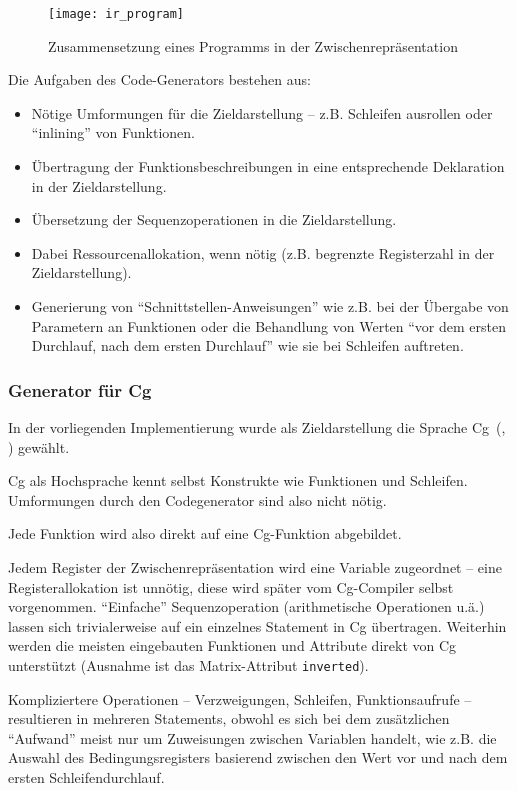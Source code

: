 \documentclass[twoside,a4paper,fleqn,12pt]{article}
\begin{document}
\begin{figure}[h]
   \centering
  \texttt{[image: ir\_program]}
  \caption{Zusammensetzung eines Programms in der Zwischenrepräsentation}
  \label{fig:ir_program}
\end{figure}

Die Aufgaben des Code-Generators bestehen aus:
\begin{itemize}
\item Nötige Umformungen für die Zieldarstellung -- z.B. Schleifen ausrollen oder ``inlining'' von Funktionen.
\item Übertragung der Funktionsbeschreibungen in eine entsprechende Deklaration in der Zieldarstellung.
\item Übersetzung der Sequenzoperationen in die Zieldarstellung. 
\item Dabei Ressourcenallokation, wenn nötig (z.B. begrenzte Registerzahl in der Zieldarstellung).
\item Generierung von "`Schnittstellen-Anweisungen"' wie z.B. bei der Übergabe von Parametern an Funktionen
oder die Behandlung von Werten "`vor dem ersten Durchlauf, nach dem ersten Durchlauf"' wie sie bei Schleifen
auftreten.
\end{itemize}

\subsubsection{Generator für Cg}

In der vorliegenden Implementierung wurde als Zieldarstellung die Sprache Cg~(\cite{cgpaper}, \cite{cg_home}) gewählt.

Cg als Hochsprache kennt selbst Konstrukte wie Funktionen und Schleifen. Umformungen durch den Codegenerator
sind also nicht nötig.

Jede Funktion wird also direkt auf eine Cg-Funktion abgebildet.

Jedem Register der Zwischenrepräsentation wird eine Variable zugeordnet -- eine Registerallokation ist unnötig, diese wird später vom Cg-Compiler selbst vorgenommen.
"`Einfache"' Sequenzoperation (arithmetische Operationen u.ä.) lassen sich trivialerweise auf ein einzelnes Statement in Cg übertragen. 
Weiterhin werden die meisten eingebauten Funktionen und Attribute direkt von Cg unterstützt (Ausnahme ist das Matrix-Attribut \texttt{inverted}).

Kompliziertere Operationen -- Verzweigungen, Schleifen, Funktionsaufrufe -- resultieren in mehreren Statements, obwohl es sich bei dem
zusätzlichen "`Aufwand"' meist nur um Zuweisungen zwischen Variablen handelt, wie z.B. die Auswahl des Bedingungsregisters basierend zwischen
den Wert vor und nach dem ersten Schleifendurchlauf.
\end{document}
